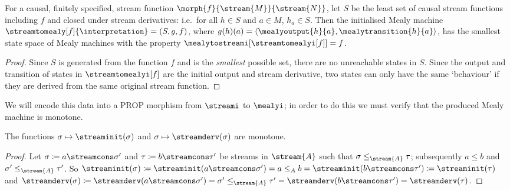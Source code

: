 \begin{corollary}\label{cor:minimal-mealy}
    For a causal, finitely specified, stream function \(
    \morph{f}{\stream{M}}{\stream{N}}
    \), let \(S\) be the least set of
    causal stream functions including \(f\) and closed under stream derivatives:
    i.e.\ for all \(h \in S\) and \(a \in M\), \(h_a \in S\).
    Then the initialised Mealy machine \(
    \streamtomealy[f]{\interpretation} = (S, g, f)
    \), where \(
    g(h)(a) = \langle \mealyoutput{h}{a}, \mealytransition{h}{a}\rangle
    \), has the smallest state space of Mealy machines with the property \(
    \mealytostreami[\streamtomealyi[f]] = f
    \).
\end{corollary}
\begin{proof}
    Since \(S\) is generated from the function \(f\) and is the \emph{smallest}
    possible set, there are no unreachable states in \(S\).
    Since the output and transition of states in
    \(\streamtomealyi[f]\) are the initial output and stream derivative, two
    states can only have the same `behaviour' if they are derived from the same
    original stream function.
\end{proof}

We will encode this data into a PROP morphism from \(\streami\) to \(\mealyi\);
in order to do this we must verify that the produced Mealy machine is monotone.

\begin{lemma}\label{lem:head-tail-monotone}
    The functions \(\sigma \mapsto \streaminit(\sigma)\) and
    \(\sigma \mapsto \streamderv(\sigma)\) are monotone.
\end{lemma}
\begin{proof}
    Let \(\sigma \coloneqq a \streamcons \sigma^\prime\) and
    \(\tau \coloneqq b \streamcons \tau^\prime\) be streams in \(\stream{A}\)
    such that \(\sigma \leq_{\stream{A}} \tau\); subsequently \(a \leq b\) and
    \(\sigma^\prime \leq_{\stream{A}} \tau^\prime\).
    So \(
    \streaminit(\sigma) \coloneqq
    \streaminit(a \streamcons \sigma^\prime) =
    a \leq_{A}
    b =
    \streaminit(b \streamcons \tau^\prime) \coloneqq
    \streaminit(\tau)
    \) and \(
    \streamderv(\sigma) \coloneqq
    \streamderv(a \streamcons \sigma^\prime) =
    \sigma^\prime \leq_{\stream{A}}
    \tau^\prime =
    \streamderv(b \streamcons \tau^\prime) =
    \streamderv(\tau)
    \).
\end{proof}

